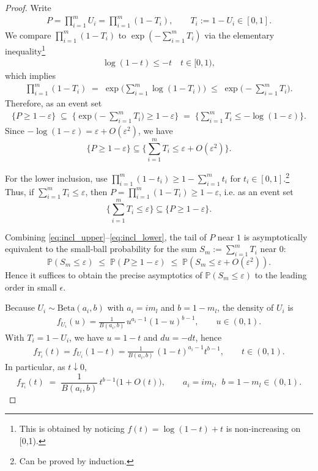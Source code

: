 \documentclass{article}
\theoremstyle{remark} %
\begin{document}
\begin{proof}
Write
\begin{align}
P=\prod_{i=1}^m U_i=\prod_{i=1}^m (1-T_i),
\qquad
T_i:=1-U_i \in [0,1].
\end{align}
We compare $\prod_{i=1}^m (1-T_i)$ to $\exp(-\sum_{i=1}^m T_i)$ via the elementary inequality\footnote{This is obtained by noticing 
$f(t)=\log(1-t)+t$ is non-increasing on [0,1).}
\begin{align}
\log(1-t)\le -t \quad t\in[0,1),
\end{align}
which implies
\begin{align}
\prod_{i=1}^m (1-T_i) \;=\; \exp \Big(\sum_{i=1}^m \log(1-T_i)\Big)
\;\le\; \exp \Big(-\sum_{i=1}^m T_i\Big).
\end{align}
Therefore, as an event set
\begin{align}
\{P\ge 1-\varepsilon\}
\;\subseteq\;
\Big\{\exp \Big(-\sum_{i=1}^m T_i\Big)\ge 1-\varepsilon\Big\}
\;=\;
\Big\{\sum_{i=1}^m T_i \le -\log(1-\varepsilon)\Big\}.
\end{align}
Since $-\log(1-\varepsilon)=\varepsilon+O(\varepsilon^2)$, we have 
\begin{equation}
\{P\ge 1-\varepsilon\} \subseteq \Big\{\sum_{i=1}^m T_i \le \varepsilon + O(\varepsilon^2)\Big\}.
\label{eq:incl_upper}
\end{equation}

For the lower inclusion, use $\prod_{i=1}^m (1-t_i)\ge 1-\sum_{i=1}^m t_i$ for $t_i\in[0,1]$.\footnote{Can be proved by induction.}
Thus, if $\sum_{i=1}^m T_i\le \varepsilon$, then $P=\prod_{i=1}^m (1-T_i)\ge 1-\varepsilon$, i.e. as an event set
\begin{equation}
\Big\{\sum_{i=1}^m T_i\le \varepsilon\Big\} \subseteq \{P\ge 1-\varepsilon\}.
\label{eq:incl_lower}
\end{equation}

Combining \eqref{eq:incl_upper}--\eqref{eq:incl_lower}, the tail of $P$ near $1$ is asymptotically equivalent to the small-ball
probability for the sum $S_m:=\sum_{i=1}^m T_i$ near $0$:
\begin{equation}
\mathbb P(S_m\le \varepsilon)
\;\le\;
\mathbb P(P\ge 1-\varepsilon)
\;\le\;
\mathbb P(S_m\le \varepsilon+O(\varepsilon^2)).
\label{eq:sandwich_sum}
\end{equation}
Hence it suffices to obtain the precise asymptotics of $\mathbb P(S_m\le \varepsilon)$ to the leading order in small $\epsilon$.


Because $U_i\sim\mathrm{Beta}(a_i,b)$ with $a_i=i m_l$ and $b=1-m_l$, the density of $U_i$ is
\begin{align}
f_{U_i}(u)=\frac{1}{B(a_i,b)}\,u^{a_i-1}(1-u)^{b-1},\qquad u\in(0,1).
\end{align}
With $T_i=1-U_i$, we have $u=1-t$ and $du=-dt$, hence
\begin{align}
f_{T_i}(t)=f_{U_i}(1-t)=\frac{1}{B(a_i,b)}\,(1-t)^{a_i-1}t^{b-1},\qquad t\in(0,1).
\end{align}
In particular, as $t\downarrow 0$,
\begin{equation}
f_{T_i}(t) \;=\; \frac{1}{B(a_i,b)}\,t^{b-1}\big(1+O(t)\big),
\qquad a_i=i m_l,\ \ b=1-m_l\in(0,1).
\label{eq:Ti_density_asym}
\end{equation}



\end{proof}
\end{document}
